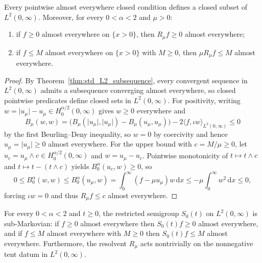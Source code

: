 \begin{lemma}\label{lem:restricted_resolvent_markov}
\leanok
Every pointwise almost everywhere closed condition defines a closed subset of $L^2(0,\infty)$. Moreover, for every $0 < \alpha < 2$ and $\mu > 0$:
\begin{enumerate}
\item if $f \ge 0$ almost everywhere on $\{x > 0\}$, then $R_\mu f \ge 0$ almost everywhere;
\item if $f \le M$ almost everywhere on $\{x > 0\}$ with $M \ge 0$, then $\mu R_\mu f \le M$ almost everywhere.
\end{enumerate}
\end{lemma}

\begin{proof}
\leanok
By Theorem~\ref{thm:std_L2_subsequence}, every convergent sequence in $L^2(0,\infty)$ admits a subsequence converging almost everywhere, so closed pointwise predicates define closed sets in $L^2(0,\infty)$. For positivity, writing $w = \lvert u_\mu \rvert - u_\mu \in H^{\alpha/2}_0(0,\infty)$ gives $w \ge 0$ everywhere and
\[
  B_\mu(w, w) = \bigl(B_\mu(\lvert u_\mu \rvert, \lvert u_\mu \rvert) - B_\mu(u_\mu, u_\mu)\bigr) - 2 \langle f, \iota w \rangle_{L^2(0,\infty)} \le 0
\]
by the first Beurling--Deny inequality, so $w = 0$ by coercivity and hence $u_\mu = \lvert u_\mu \rvert \ge 0$ almost everywhere. For the upper bound with $c = M / \mu \ge 0$, let $u_c = u_\mu \wedge c \in H^{\alpha/2}_0(0,\infty)$ and $w = u_\mu - u_c$. Pointwise monotonicity of $t \mapsto t \wedge c$ and $t \mapsto t - (t \wedge c)$ yields $B^\alpha_0(u_c, w) \ge 0$, so
\[
  0 \le B^\alpha_0(w, w) \le B^\alpha_0(u_\mu, w) = \int_0^\infty (f - \mu u_\mu) w \, \mathrm{d}x \le -\mu \int_0^\infty w^2 \, \mathrm{d}x \le 0,
\]
forcing $\iota w = 0$ and thus $R_\mu f \le c$ almost everywhere.
\end{proof}

\begin{theorem}\label{thm:restricted_semigroup_markov}
\leanok
For every $0 < \alpha < 2$ and $t \ge 0$, the restricted semigroup $S_0(t)$ on $L^2(0,\infty)$ is sub-Markovian: if $f \ge 0$ almost everywhere then $S_0(t) f \ge 0$ almost everywhere, and if $f \le M$ almost everywhere with $M \ge 0$ then $S_0(t) f \le M$ almost everywhere. Furthermore, the resolvent $R_\mu$ acts nontrivially on the nonnegative tent datum in $L^2(0,\infty)$.
\end{theorem}

